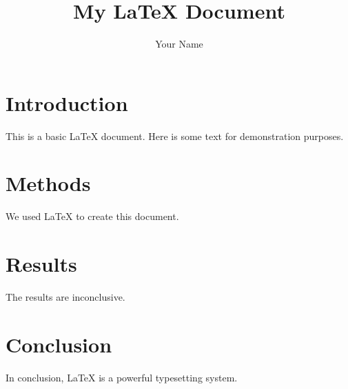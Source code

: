 \documentclass[12pt, a4paper]{article}
\title{My \LaTeX{} Document}
\author{Your Name}
\begin{document}
\maketitle

\section{Introduction}
This is a basic LaTeX document.\cite{jones2015} Here is some text for demonstration purposes. \lipsum[1]

\section{Methods}
We used LaTeX to create this document\cite{brown2018}. \lipsum[2]

\section{Results}
The results are inconclusive. \lipsum[3]

\section{Conclusion}
In conclusion, LaTeX is a powerful typesetting system.\cite{doe2020} \lipsum[4]

\printbibliography[title={References}] %
\end{document}
